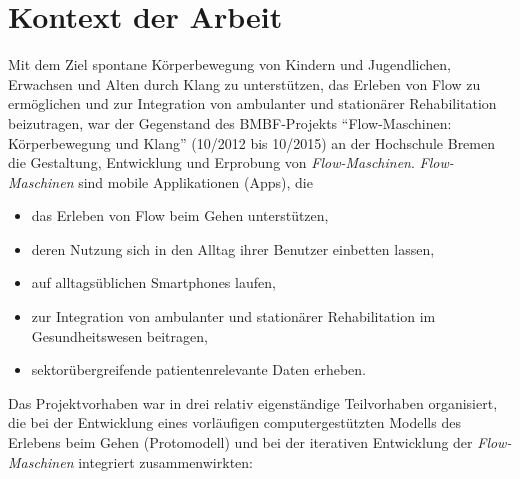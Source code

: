\section{Kontext der Arbeit} %
\label{sec:kontext_der_arbeit}

Mit dem Ziel spontane Körperbewegung von Kindern und Jugendlichen, Erwachsen und Alten durch Klang zu unterstützen, das Erleben von Flow zu ermöglichen und zur Integration von ambulanter und stationärer Rehabilitation beizutragen, war der Gegenstand des \acs{BMBF}-Projekts "`Flow-Maschinen: Körperbewegung und Klang"' (10/2012 bis 10/2015) an der Hochschule Bremen die Gestaltung, Entwicklung und Erprobung von \emph{Flow-Maschinen}. \emph{Flow-Maschinen} sind mobile Applikationen (Apps), die
\begin{itemize}

	\item das Erleben von Flow beim Gehen unterstützen,

	\item deren Nutzung sich in den Alltag ihrer Benutzer einbetten lassen,

	\item auf alltagsüblichen Smartphones laufen,

	\item zur Integration von ambulanter und stationärer Rehabilitation im Gesundheitswesen beitragen,

	\item sektorübergreifende patientenrelevante Daten erheben.

\end{itemize}

Das Projektvorhaben war in drei relativ eigenständige Teilvorhaben organisiert, die bei der Entwicklung eines vorläufigen computergestützten Modells des Erlebens beim Gehen (Protomodell) und bei der iterativen Entwicklung der \emph{Flow-Maschinen} integriert zusammenwirkten:

